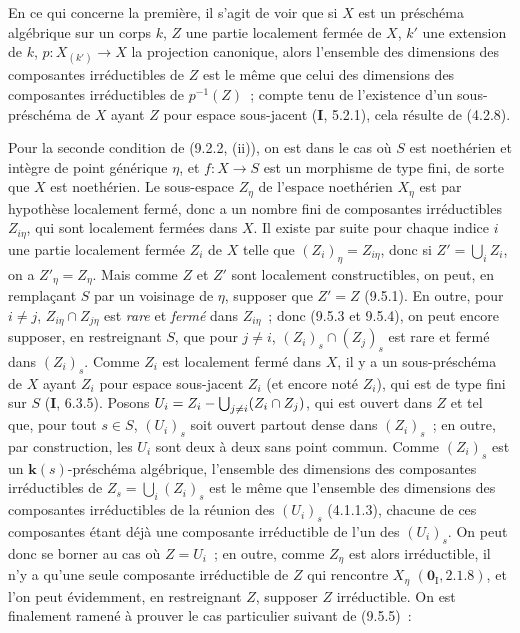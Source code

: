 En ce qui concerne la première, il s'agit de voir que si $X$ est un préschéma
algébrique sur un corps $k$, $Z$ une partie localement fermée de $X$, $k'$ une
extension de $k$, $p:X_{(k')}\to X$ la projection canonique, alors l'ensemble
des dimensions des composantes irréductibles de $Z$ est le même que celui des
dimensions des composantes irréductibles de $p^{-1}(Z)$~; compte tenu de
l'existence d'un sous-préschéma de $X$ ayant $Z$ pour espace sous-jacent
(\textbf{I}, 5.2.1), cela résulte de (4.2.8).

Pour la seconde condition de (9.2.2, (ii)), on est dans le cas où $S$ est
noethérien et intègre de point générique $\eta$, et $f:X\to S$ est un
morphisme de type fini, de sorte que $X$ est noethérien. Le sous-espace
$Z_\eta$ de l'espace noethérien $X_\eta$ est par hypothèse localement fermé,
donc a un nombre fini de composantes irréductibles $Z_{i\eta}$, qui sont
localement fermées dans $X$. Il existe par suite pour chaque indice $i$
une partie localement fermée $Z_i$ de $X$ telle que $(Z_i)_\eta=Z_{i\eta}$,
donc si $Z'=\bigcup_i Z_i$, on a $Z'_\eta=Z_\eta$. Mais comme $Z$ et $Z'$ sont
localement constructibles, on peut, en remplaçant $S$ par un voisinage de
$\eta$, supposer que $Z'=Z$ (9.5.1). En outre, pour $i\neq j$,
$Z_{i\eta}\cap Z_{j\eta}$ est \emph{rare} et \emph{fermé} dans $Z_{i\eta}$~; donc
(9.5.3 et 9.5.4), on peut encore supposer, en restreignant $S$, que pour
$j\neq i$, $(Z_i)_s\cap(Z_j)_s$ est rare et fermé dans $(Z_i)_s$. Comme $Z_i$
est localement fermé dans $X$, il y a un sous-préschéma de $X$ ayant $Z_i$
pour espace sous-jacent $Z_i$ (et encore noté $Z_i$), qui est de type fini sur
$S$ (\textbf{I}, 6.3.5). Posons
$U_i=Z_i-\bigcup_{j\neq i}(Z_i\cap Z_j)$, qui est ouvert dans $Z$ et tel que,
pour tout $s\in S$, $(U_i)_s$ soit ouvert partout dense dans $(Z_i)_s$~; en
outre, par construction, les $U_i$ sont deux à deux sans point commun. Comme
$(Z_i)_s$ est un $\boldsymbol{k}(s)$-préschéma algébrique, l'ensemble des dimensions des
composantes irréductibles de $Z_s=\bigcup_i(Z_i)_s$ est le même que l'ensemble
des dimensions des composantes irréductibles de la réunion des $(U_i)_s$
(4.1.1.3), chacune de ces composantes étant déjà une composante irréductible
de l'un des $(U_i)_s$. On peut donc se borner au cas où $Z=U_i$~; en outre,
comme $Z_\eta$ est alors irréductible, il n'y a qu'une seule composante
irréductible de $Z$ qui rencontre $X_\eta$ $(\mathbf 0_{\mathrm I},2.1.8)$, et
l'on peut évidemment, en restreignant $Z$, supposer $Z$ irréductible. On est
finalement ramené à prouver le cas particulier suivant de (9.5.5)~:

